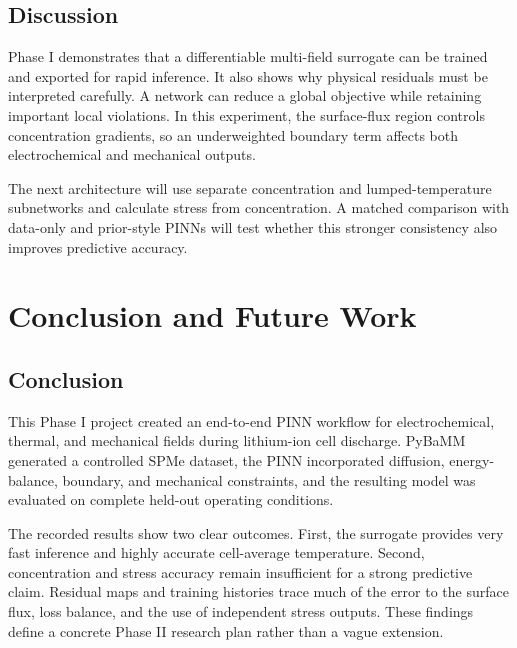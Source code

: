 \documentclass[14pt,a4paper,oneside]{extreport}
\begin{document}
\section{Discussion}
Phase I demonstrates that a differentiable multi-field surrogate can be trained and exported for rapid inference. It also shows why physical residuals must be interpreted carefully. A network can reduce a global objective while retaining important local violations. In this experiment, the surface-flux region controls concentration gradients, so an underweighted boundary term affects both electrochemical and mechanical outputs.

The next architecture will use separate concentration and lumped-temperature subnetworks and calculate stress from concentration. A matched comparison with data-only and prior-style PINNs will test whether this stronger consistency also improves predictive accuracy.

\chapter{Conclusion and Future Work}
\section{Conclusion}
This Phase I project created an end-to-end PINN workflow for electrochemical, thermal, and mechanical fields during lithium-ion cell discharge. PyBaMM generated a controlled SPMe dataset, the PINN incorporated diffusion, energy-balance, boundary, and mechanical constraints, and the resulting model was evaluated on complete held-out operating conditions.

The recorded results show two clear outcomes. First, the surrogate provides very fast inference and highly accurate cell-average temperature. Second, concentration and stress accuracy remain insufficient for a strong predictive claim. Residual maps and training histories trace much of the error to the surface flux, loss balance, and the use of independent stress outputs. These findings define a concrete Phase II research plan rather than a vague extension.
\end{document}

